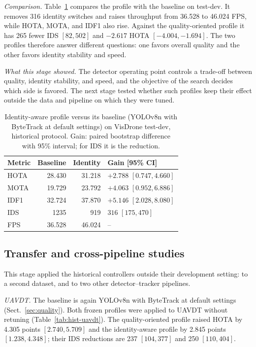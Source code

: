 \documentclass[pdflatex,sn-mathphys-num,iicol]{sn-jnl}
\begin{document}
\emph{Comparison.} Table~\ref{tab:identity} compares the profile with the
baseline on test-dev. It removes 316 identity switches and raises throughput
from 36.528 to 46.024 FPS, while HOTA, MOTA, and IDF1 also rise. Against the
quality-oriented profile it has 265 fewer IDS $[82, 502]$ and $-2.617$ HOTA
$[-4.004, -1.694]$. The two profiles therefore answer different questions: one
favors overall quality and the other favors identity stability and speed.

\emph{What this stage showed.} The detector operating point controls a
trade-off between quality, identity stability, and speed, and the objective
of the search decides which side is favored. The next stage tested whether
such profiles keep their effect outside the data and pipeline on which they
were tuned.

\begin{table}[t]
\caption{Identity-aware profile versus its baseline (YOLOv8n with ByteTrack at
default settings) on VisDrone test-dev, historical protocol. Gain: paired
bootstrap difference with 95\% interval; for IDS it is the reduction.}
\label{tab:identity}
\centering\footnotesize
\setlength{\tabcolsep}{4pt}
\begin{tabular}{@{}lrrl@{}}
\toprule
Metric & Baseline & Identity & Gain [95\% CI]\\
\midrule
HOTA & 28.430 & 31.218 & $+2.788$ $[0.747, 4.660]$\\
MOTA & 19.729 & 23.792 & $+4.063$ $[0.952, 6.886]$\\
IDF1 & 32.724 & 37.870 & $+5.146$ $[2.028, 8.080]$\\
IDS & 1235 & 919 & $316$ $[175, 470]$\\
FPS & 36.528 & 46.024 & --\\
\bottomrule
\end{tabular}
\end{table}

\subsection{Transfer and cross-pipeline studies}\label{sec:transfer}

This stage applied the historical controllers outside their development
setting: to a second dataset, and to two other detector--tracker pipelines.

\emph{UAVDT.} The baseline is again YOLOv8n with ByteTrack at default settings
(Sect.~\ref{sec:quality}). Both frozen profiles were applied to UAVDT
\cite{du2018uavdt} without retuning (Table~\ref{tab:hist-uavdt}). The
quality-oriented profile raised HOTA by 4.305 points $[2.740, 5.709]$ and the
identity-aware profile by 2.845 points $[1.238, 4.348]$; their IDS reductions
are 237 $[104, 377]$ and 250 $[110, 404]$.
\end{document}
